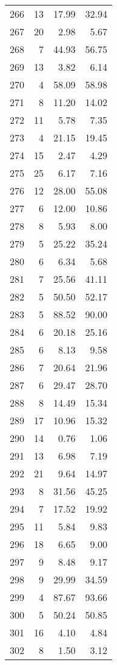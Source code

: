\begin{longtable}{c r r r}
  266 & 13  & 17.99 & 32.94 \\ 
  267 & 20  & 2.98 & 5.67 \\ 
  268 & 7  & 44.93 & 56.75 \\ 
  269 & 13  & 3.82 & 6.14 \\ 
  270 & 4  & 58.09 & 58.98 \\ 
  271 & 8  & 11.20 & 14.02 \\ 
  272 & 11  & 5.78 & 7.35 \\ 
  273 & 4  & 21.15 & 19.45 \\ 
  274 & 15  & 2.47 & 4.29 \\ 
  275 & 25  & 6.17 & 7.16 \\ 
  276 & 12  & 28.00 & 55.08 \\ 
  277 & 6  & 12.00 & 10.86 \\ 
  278 & 8  & 5.93 & 8.00 \\ 
  279 & 5  & 25.22 & 35.24 \\ 
  280 & 6  & 6.34 & 5.68 \\ 
  281 & 7  & 25.56 & 41.11 \\ 
  282 & 5  & 50.50 & 52.17 \\ 
  283 & 5  & 88.52 & 90.00 \\ 
  284 & 6  & 20.18 & 25.16 \\ 
  285 & 6  & 8.13 & 9.58 \\ 
  286 & 7  & 20.64 & 21.96 \\ 
  287 & 6  & 29.47 & 28.70 \\ 
  288 & 8  & 14.49 & 15.34 \\ 
  289 & 17  & 10.96 & 15.32 \\ 
  290 & 14  & 0.76 & 1.06 \\ 
  291 & 13  & 6.98 & 7.19 \\ 
  292 & 21  & 9.64 & 14.97 \\ 
  293 & 8  & 31.56 & 45.25 \\ 
  294 & 7  & 17.52 & 19.92 \\ 
  295 & 11  & 5.84 & 9.83 \\ 
  296 & 18  & 6.65 & 9.00 \\ 
  297 & 9  & 8.48 & 9.17 \\ 
  298 & 9  & 29.99 & 34.59 \\ 
  299 & 4  & 87.67 & 93.66 \\ 
  300 & 5  & 50.24 & 50.85 \\ 
  301 & 16  & 4.10 & 4.84 \\ 
  302 & 8  & 1.50 & 3.12 \\ 

\end{longtable}
